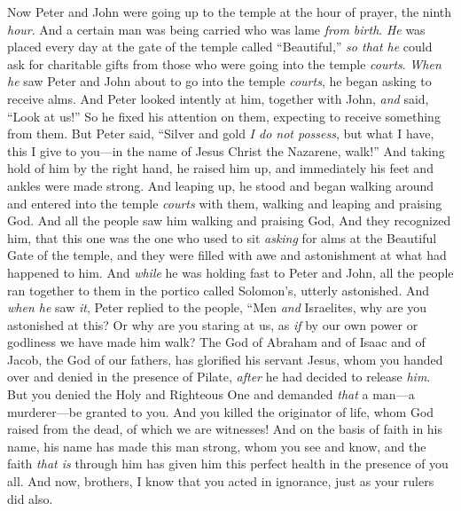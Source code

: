 \begin{biblechapter} %
 Now Peter and John were going up to the temple at the hour of prayer, the ninth \textit{hour}.
\verse And a certain man was being carried who was lame \textit{from birth}. \textit{He} was placed every day at the gate of the temple called “Beautiful,” \textit{so that he} could ask for charitable gifts from those who were going into the temple \textit{courts}.
\verse \textit{When he} saw Peter and John about to go into the temple \textit{courts}, he began asking to receive alms.
\verse And Peter looked intently at him, together with John, \textit{and} said, “Look at us!”
\verse So he fixed his attention on them, expecting to receive something from them.
\verse But Peter said, “Silver and gold \textit{I do not possess}, but what I have, this I give to you—in the name of Jesus Christ the Nazarene, walk!”
\verse And taking hold of him by the right hand, he raised him up, and immediately his feet and ankles were made strong.
\verse And leaping up, he stood and began walking around and entered into the temple \textit{courts} with them, walking and leaping and praising God.
\verse And all the people saw him walking and praising God,
\verse And they recognized him, that this one was the one who used to sit \textit{asking} for alms at the Beautiful Gate of the temple, and they were filled with awe and astonishment at what had happened to him.
 And \textit{while} he was holding fast to Peter and John, all the people ran together to them in the portico called Solomon’s, utterly astonished.
\verse And \textit{when he} saw \textit{it}, Peter replied to the people, “Men \textit{and} Israelites, why are you astonished at this? Or why are you staring at us, as \textit{if} by our own power or godliness we have made him walk?
\verse The God of Abraham and of Isaac and of Jacob, the God of our fathers, has glorified his servant Jesus, whom you handed over and denied in the presence of Pilate, \textit{after} he had decided to release \textit{him}.
\verse But you denied the Holy and Righteous One and demanded \textit{that} a man—a murderer—be granted to you.
\verse And you killed the originator of life, whom God raised from the dead, of which we are witnesses!
\verse And on the basis of faith in his name, his name has made this man strong, whom you see and know, and the faith \textit{that is} through him has given him this perfect health in the presence of you all.
\verse And now, brothers, I know that you acted in ignorance, just as your rulers did also.

\end{biblechapter}
